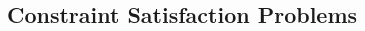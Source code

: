 \documentclass[11pt, a4paper]{article}
\begin{document}
\begin{multicols*}{1}
        \section*{Constraint Satisfaction Problems}
    \end{multicols*}
\end{document}

